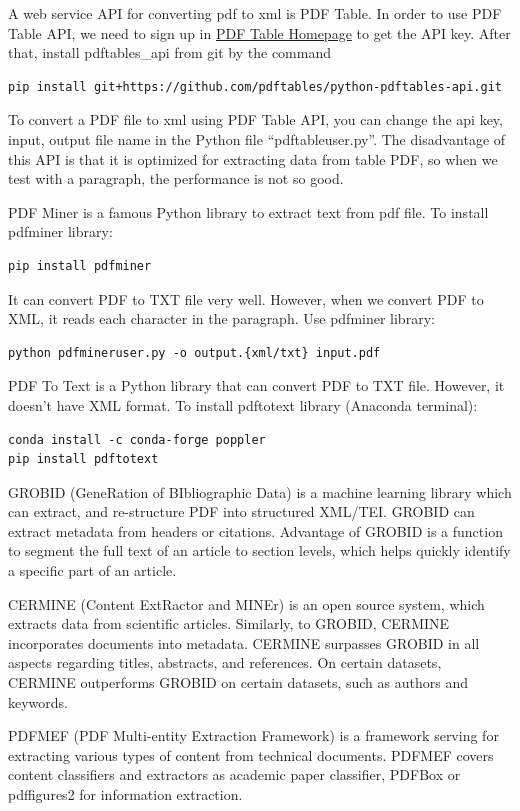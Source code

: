 \documentclass[
10pt, %
a4paper, %
oneside, %
headinclude,footinclude, %
BCOR5mm, %
]{scrartcl}
\begin{document}
A web service API for converting pdf to xml is PDF Table.
In order to use PDF Table API, we need to sign up in \href{https://pdftables.com}{PDF Table Homepage} to get the API key.
After that, install pdftables\_api from git by the command
\begin{verbatim}
pip install git+https://github.com/pdftables/python-pdftables-api.git
\end{verbatim}
To convert a PDF file to xml using PDF Table API, you can change the api key, input, output file name in the Python file ``pdftableuser.py''.
The disadvantage of this API is that it is optimized for extracting data from table PDF, so when we test with a paragraph, the performance is not so good.

PDF Miner is a famous Python library to extract text from pdf file.
To install pdfminer library:
\begin{verbatim}
pip install pdfminer
\end{verbatim}
It can convert PDF to TXT file very well. However, when we convert PDF to XML, it reads each character in the paragraph.
Use pdfminer library:
\begin{verbatim}
python pdfmineruser.py -o output.{xml/txt} input.pdf
\end{verbatim}

PDF To Text is a Python library that can convert PDF to TXT file.
However, it doesn't have XML format. To install pdftotext library (Anaconda terminal):\begin{verbatim}
conda install -c conda-forge poppler
pip install pdftotext
\end{verbatim}

GROBID (GeneRation of BIbliographic Data) is a machine learning library which can extract, 
and re-structure PDF into structured XML/TEI. GROBID can extract metadata from headers or citations. 
Advantage of GROBID is a function to segment the full text of an article to section levels, 
which helps quickly identify a specific part of an article.

CERMINE (Content ExtRactor and MINEr) is an open source system, which extracts data from scientific articles. 
Similarly, to GROBID, CERMINE incorporates documents into metadata. CERMINE surpasses GROBID in all aspects regarding titles, 
abstracts, and references. On certain datasets, CERMINE outperforms GROBID on certain datasets, such as authors and keywords.

PDFMEF (PDF Multi-entity Extraction Framework) is a framework serving for extracting various types of content from technical documents. 
PDFMEF covers content classifiers and extractors as academic paper classifier, PDFBox or pdffigures2 for information extraction. 
\end{document}
